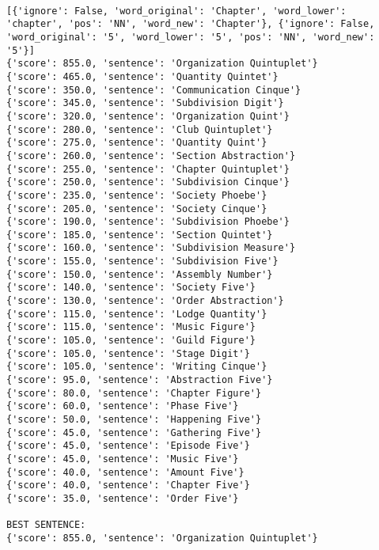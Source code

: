 \documentclass[12pt,a4paper,oneside]{book}
\begin{document}
\begin{verbatim}

[{'ignore': False, 'word_original': 'Chapter', 'word_lower': 'chapter', 'pos': 'NN', 'word_new': 'Chapter'}, {'ignore': False, 'word_original': '5', 'word_lower': '5', 'pos': 'NN', 'word_new': '5'}]
{'score': 855.0, 'sentence': 'Organization Quintuplet'}
{'score': 465.0, 'sentence': 'Quantity Quintet'}
{'score': 350.0, 'sentence': 'Communication Cinque'}
{'score': 345.0, 'sentence': 'Subdivision Digit'}
{'score': 320.0, 'sentence': 'Organization Quint'}
{'score': 280.0, 'sentence': 'Club Quintuplet'}
{'score': 275.0, 'sentence': 'Quantity Quint'}
{'score': 260.0, 'sentence': 'Section Abstraction'}
{'score': 255.0, 'sentence': 'Chapter Quintuplet'}
{'score': 250.0, 'sentence': 'Subdivision Cinque'}
{'score': 235.0, 'sentence': 'Society Phoebe'}
{'score': 205.0, 'sentence': 'Society Cinque'}
{'score': 190.0, 'sentence': 'Subdivision Phoebe'}
{'score': 185.0, 'sentence': 'Section Quintet'}
{'score': 160.0, 'sentence': 'Subdivision Measure'}
{'score': 155.0, 'sentence': 'Subdivision Five'}
{'score': 150.0, 'sentence': 'Assembly Number'}
{'score': 140.0, 'sentence': 'Society Five'}
{'score': 130.0, 'sentence': 'Order Abstraction'}
{'score': 115.0, 'sentence': 'Lodge Quantity'}
{'score': 115.0, 'sentence': 'Music Figure'}
{'score': 105.0, 'sentence': 'Guild Figure'}
{'score': 105.0, 'sentence': 'Stage Digit'}
{'score': 105.0, 'sentence': 'Writing Cinque'}
{'score': 95.0, 'sentence': 'Abstraction Five'}
{'score': 80.0, 'sentence': 'Chapter Figure'}
{'score': 60.0, 'sentence': 'Phase Five'}
{'score': 50.0, 'sentence': 'Happening Five'}
{'score': 45.0, 'sentence': 'Gathering Five'}
{'score': 45.0, 'sentence': 'Episode Five'}
{'score': 45.0, 'sentence': 'Music Five'}
{'score': 40.0, 'sentence': 'Amount Five'}
{'score': 40.0, 'sentence': 'Chapter Five'}
{'score': 35.0, 'sentence': 'Order Five'}

BEST SENTENCE:
{'score': 855.0, 'sentence': 'Organization Quintuplet'}



\end{verbatim}
\end{document}
